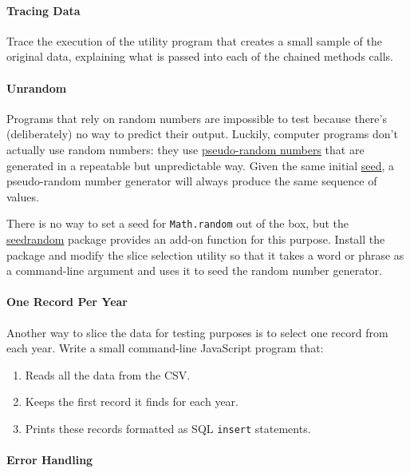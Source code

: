 \paragraph{Tracing Data}\label{tracing-data}

Trace the execution of the utility program that creates a small sample
of the original data, explaining what is passed into each of the chained
methods calls.

\paragraph{Unrandom}\label{unrandom}

Programs that rely on random numbers are impossible to test because
there's (deliberately) no way to predict their output. Luckily, computer
programs don't actually use random numbers: they use
\protect\hyperlink{g:pseudo-random-number}{pseudo-random numbers} that
are generated in a repeatable but unpredictable way. Given the same
initial \protect\hyperlink{g:seed}{seed}, a pseudo-random number
generator will always produce the same sequence of values.

There is no way to set a seed for \texttt{Math.random} out of the box,
but the \href{https://www.npmjs.com/package/seedrandom}{seedrandom}
package provides an add-on function for this purpose. Install the
package and modify the slice selection utility so that it takes a word
or phrase as a command-line argument and uses it to seed the random
number generator.

\paragraph{One Record Per Year}\label{one-record-per-year}

Another way to slice the data for testing purposes is to select one
record from each year. Write a small command-line JavaScript program
that:

\begin{enumerate}
\tightlist
\item
  Reads all the data from the CSV.
\item
  Keeps the first record it finds for each year.
\item
  Prints these records formatted as SQL \texttt{insert} statements.
\end{enumerate}

\paragraph{Error Handling}\label{error-handling}

